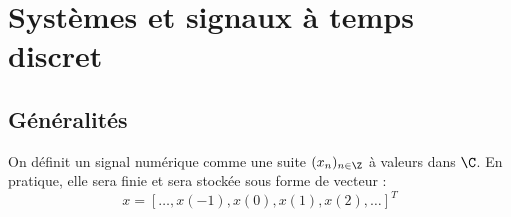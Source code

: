 \minitoc 


\section{Systèmes et signaux à temps discret}

\subsection{Généralités}

\begin{definition}[Signal]
    On définit un signal numérique comme une suite $(x_n)_{n \in \Z} $ 
    à valeurs dans $ \C$. 
    En pratique, elle sera finie et sera stockée sous forme de vecteur :
    $$ x = [\dots, x(-1), x(0), x(1), x(2), \dots]^T $$
\end{definition}

